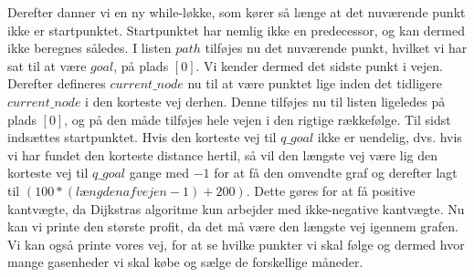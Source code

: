 Derefter danner vi en ny while-løkke, som kører så længe at det nuværende punkt ikke er startpunktet. Startpunktet har nemlig ikke en predecessor, og kan dermed ikke beregnes således. I listen $path$ tilføjes nu det nuværende punkt, hvilket vi har sat til at være $goal$, på plads $[0]$. Vi kender dermed det sidste punkt i vejen. Derefter defineres $current\_node$ nu til at være punktet lige inden det tidligere $current\_node$ i den korteste vej derhen. Denne tilføjes nu til listen ligeledes på plads $[0]$, og på den måde tilføjes hele vejen i den rigtige rækkefølge. Til sidst indsættes startpunktet.
Hvis den korteste vej til $q\_goal$ ikke er uendelig, dvs. hvis vi har fundet den korteste distance hertil, så vil den længste vej være lig den korteste vej til $q\_goal$ gange med $-1$ for at få den omvendte graf og derefter lagt til $(100*(længden af vejen-1)+200)$. Dette gøres for at få positive kantvægte, da Dijkstras algoritme kun arbejder med ikke-negative kantvægte.
Nu kan vi printe den største profit, da det må være den længste vej igennem grafen. Vi kan også printe vores vej, for at se hvilke punkter vi skal følge og dermed hvor mange gasenheder vi skal købe og sælge de forskellige måneder.
%
%
%
%
%
%
%

